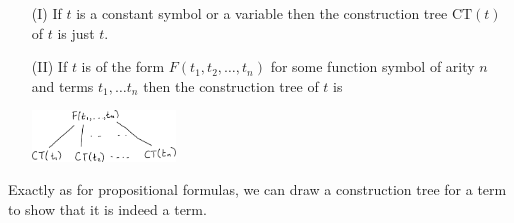 \documentclass[11pt]{article}
\begin{document}
\begin{enumerate}
\item[(I)] If $t$ is a constant symbol or a variable then the construction tree $\text{CT}(t)$ of $t$ is just $t$.
\item[(II)] If $t$ is of the form $F(t_1,t_2,\ldots, t_n)$ for some function symbol of arity $n$ and terms $t_1,\ldots t_n$ then the construction tree of $t$ is

  \begin{center}
     \includegraphics[width=0.3\textwidth]{Termtreedef}
     \end{center}
%
\end{enumerate}

Exactly as for propositional formulas, we can draw a construction tree for a term to show that it is indeed a term.
\end{document}
